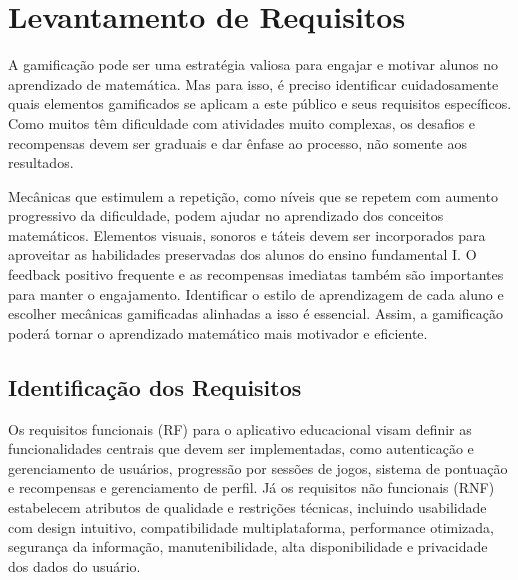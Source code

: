 \section{Levantamento de Requisitos}

A gamificação pode ser uma estratégia valiosa para engajar e motivar alunos no aprendizado de matemática. Mas para isso, é preciso identificar cuidadosamente quais elementos gamificados se aplicam a este público e seus requisitos específicos. Como muitos têm dificuldade com atividades muito complexas, os desafios e recompensas devem ser graduais e dar ênfase ao processo, não somente aos resultados.

Mecânicas que estimulem a repetição, como níveis que se repetem com aumento progressivo da dificuldade, podem ajudar no aprendizado dos conceitos matemáticos. Elementos visuais, sonoros e táteis devem ser incorporados para aproveitar as habilidades preservadas dos alunos do ensino fundamental I. O feedback positivo frequente e as recompensas imediatas também são importantes para manter o engajamento. Identificar o estilo de aprendizagem de cada aluno e escolher mecânicas gamificadas alinhadas a isso é essencial. Assim, a gamificação poderá tornar o aprendizado matemático mais motivador e eficiente.


\subsection{Identificação dos Requisitos}


Os requisitos funcionais (RF) para o aplicativo educacional visam definir as funcionalidades centrais que devem ser implementadas, como autenticação e gerenciamento de usuários, progressão por sessões de jogos, sistema de pontuação e recompensas e gerenciamento de perfil. 
Já os requisitos não funcionais (RNF) estabelecem atributos de qualidade e restrições técnicas, incluindo usabilidade com design intuitivo, compatibilidade multiplataforma, performance otimizada, segurança da informação, manutenibilidade, alta disponibilidade e privacidade dos dados do usuário.


